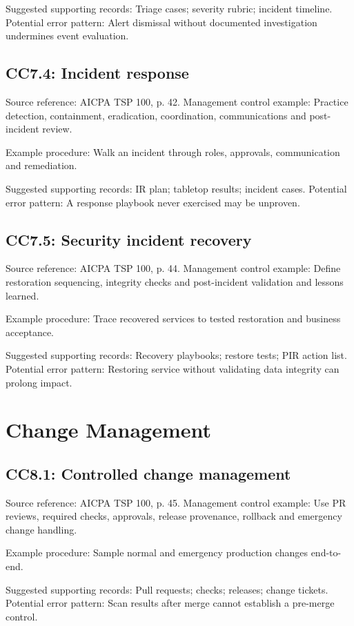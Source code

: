 \documentclass[10pt,oneside]{report}
\begin{document}
Suggested supporting records: Triage cases; severity rubric; incident timeline. Potential error pattern: Alert dismissal without documented investigation undermines event evaluation.

\subsection*{CC7.4: Incident response}
Source reference: AICPA TSP 100, p. 42. Management control example: Practice detection, containment, eradication, coordination, communications and post-incident review.

Example procedure: Walk an incident through roles, approvals, communication and remediation.

Suggested supporting records: IR plan; tabletop results; incident cases. Potential error pattern: A response playbook never exercised may be unproven.

\subsection*{CC7.5: Security incident recovery}
Source reference: AICPA TSP 100, p. 44. Management control example: Define restoration sequencing, integrity checks and post-incident validation and lessons learned.

Example procedure: Trace recovered services to tested restoration and business acceptance.

Suggested supporting records: Recovery playbooks; restore tests; PIR action list. Potential error pattern: Restoring service without validating data integrity can prolong impact.

\section{Change Management}
\subsection*{CC8.1: Controlled change management}
Source reference: AICPA TSP 100, p. 45. Management control example: Use PR reviews, required checks, approvals, release provenance, rollback and emergency change handling.

Example procedure: Sample normal and emergency production changes end-to-end.

Suggested supporting records: Pull requests; checks; releases; change tickets. Potential error pattern: Scan results after merge cannot establish a pre-merge control.
\end{document}
